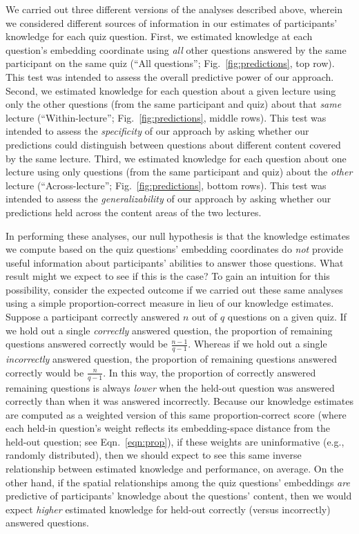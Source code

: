 \documentclass[10pt]{article}
\begin{document}
We carried out three different versions of the analyses described above,
wherein we considered different sources of information in our estimates of
participants' knowledge for each quiz question. First, we estimated knowledge
at each question's embedding coordinate using \textit{all} other questions
answered by the same participant on the same quiz (``All questions'';
Fig.~\ref{fig:predictions}, top row). This test was intended to assess the
overall predictive power of our approach. Second, we estimated knowledge for
each question about a given lecture using only the other questions (from the
same participant and quiz) about that \textit{same} lecture
(``Within-lecture''; Fig.~\ref{fig:predictions}, middle rows). This test was
intended to assess the \textit{specificity} of our approach by asking whether
our predictions could distinguish between questions about different content
covered by the same lecture. Third, we estimated knowledge for each question
about one lecture using only questions (from the same participant and quiz)
about the \textit{other} lecture (``Across-lecture'';
Fig.~\ref{fig:predictions}, bottom rows). This test was intended to assess the
\textit{generalizability} of our approach by asking whether our predictions
held across the content areas of the two lectures.

In performing these analyses, our null hypothesis is that the knowledge
estimates we compute based on the quiz questions' embedding coordinates do
\textit{not} provide useful information about participants' abilities to answer
those questions. What result might we expect to see if this is the case? To
gain an intuition for this possibility, consider the expected outcome if we
carried out these same analyses using a simple proportion-correct measure in
lieu of our knowledge estimates. Suppose a participant correctly answered $n$
out of $q$ questions on a given quiz. If we hold out a single
\textit{correctly} answered question, the proportion of remaining questions
answered correctly would be $\frac{n - 1}{q - 1}$. Whereas if we hold out a single
\textit{incorrectly} answered question, the proportion of remaining questions
answered correctly would be $\frac{n}{q - 1}$. In this way, the proportion of
correctly answered remaining questions is always \textit{lower} when the
held-out question was answered correctly than when it was answered incorrectly.
Because our knowledge estimates are computed as a weighted version of this same
proportion-correct score (where each held-in question's weight reflects its
embedding-space distance from the held-out question; see Eqn.~\ref{eqn:prop}),
if these weights are uninformative (e.g., randomly distributed), then we
should expect to see this same inverse relationship between estimated knowledge
and performance, on average. On the other hand, if the spatial relationships
among the quiz questions' embeddings \textit{are} predictive of participants'
knowledge about the questions' content, then we would expect \textit{higher}
estimated knowledge for held-out correctly (versus incorrectly) answered
questions.
\end{document}
